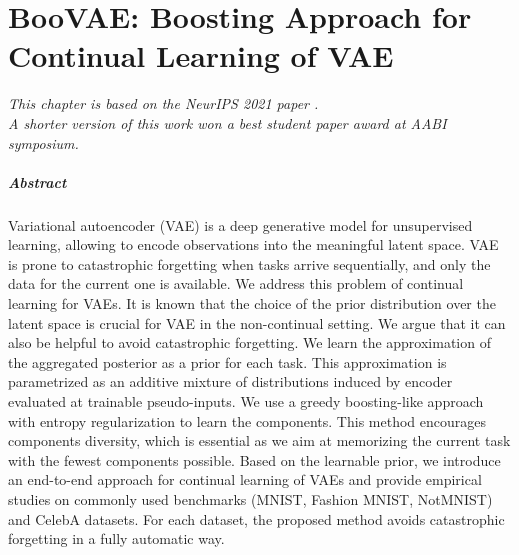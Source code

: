 \chapter{BooVAE: Boosting Approach for Continual Learning of VAE}\label{chap:boovae}

\begin{flushright}
	\small{
		\textit{
			\hfill This chapter is based on the NeurIPS 2021 paper \citep{egorov2021boovae}.\\ 
			\hfill A shorter version of this work won a best student paper award at AABI symposium.
		} 
		
	}
\end{flushright}

\paragraph{Abstract}
Variational autoencoder (VAE) is a deep generative model for unsupervised learning, allowing to encode observations into the meaningful latent space. VAE is prone to catastrophic forgetting when tasks arrive sequentially, and only the data for the current one is available. We address this problem of continual learning for VAEs. It is known that the choice of the prior distribution over the latent space is crucial for VAE in the non-continual setting. We argue that it can also be helpful to avoid catastrophic forgetting. We learn the approximation of the aggregated posterior as a prior for each task. This approximation is parametrized as an additive mixture of distributions induced by encoder evaluated at trainable pseudo-inputs. We use a greedy boosting-like approach with entropy regularization to learn the components. This method encourages components diversity, which is essential as we aim at memorizing the current task with the fewest components possible. Based on the learnable prior, we introduce an end-to-end approach for continual learning of VAEs and provide empirical studies on commonly used benchmarks (MNIST, Fashion MNIST, NotMNIST) and CelebA datasets. For each dataset, the proposed method avoids catastrophic forgetting in a fully automatic way.

